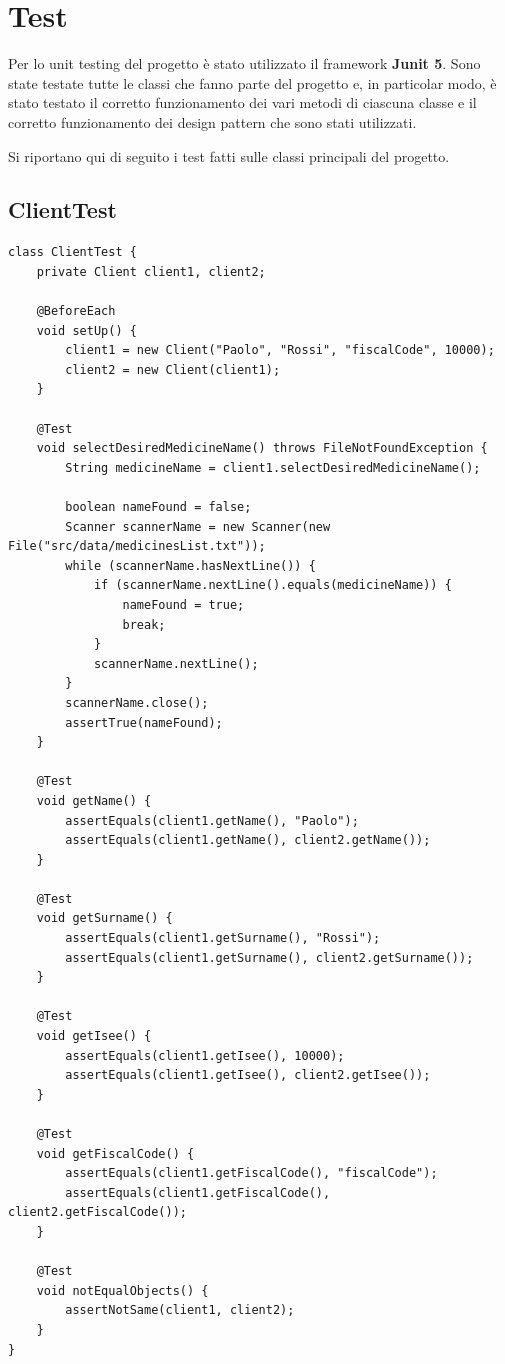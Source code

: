 \documentclass[a4paper, 10pt]{report}
\begin{document}
\chapter{Test}
Per lo unit testing del progetto è stato utilizzato il framework \textbf{Junit 5}. Sono state testate tutte le classi che fanno parte del progetto e, in particolar modo, è stato testato il corretto funzionamento dei vari metodi di ciascuna classe e il corretto funzionamento dei design pattern che sono stati utilizzati.

Si riportano qui di seguito i test fatti sulle classi principali del progetto.
\section{ClientTest}
\begin{lstlisting}
class ClientTest {
    private Client client1, client2;

    @BeforeEach
    void setUp() {
        client1 = new Client("Paolo", "Rossi", "fiscalCode", 10000);
        client2 = new Client(client1);
    }

    @Test
    void selectDesiredMedicineName() throws FileNotFoundException {
        String medicineName = client1.selectDesiredMedicineName();

        boolean nameFound = false;
        Scanner scannerName = new Scanner(new File("src/data/medicinesList.txt"));
        while (scannerName.hasNextLine()) {
            if (scannerName.nextLine().equals(medicineName)) {
                nameFound = true;
                break;
            }
            scannerName.nextLine();
        }
        scannerName.close();
        assertTrue(nameFound);
    }

    @Test
    void getName() {
        assertEquals(client1.getName(), "Paolo");
        assertEquals(client1.getName(), client2.getName());
    }

    @Test
    void getSurname() {
        assertEquals(client1.getSurname(), "Rossi");
        assertEquals(client1.getSurname(), client2.getSurname());
    }

    @Test
    void getIsee() {
        assertEquals(client1.getIsee(), 10000);
        assertEquals(client1.getIsee(), client2.getIsee());
    }

    @Test
    void getFiscalCode() {
        assertEquals(client1.getFiscalCode(), "fiscalCode");
        assertEquals(client1.getFiscalCode(), client2.getFiscalCode());
    }

    @Test
    void notEqualObjects() {
        assertNotSame(client1, client2);
    }
}
\end{lstlisting}
\end{document}
